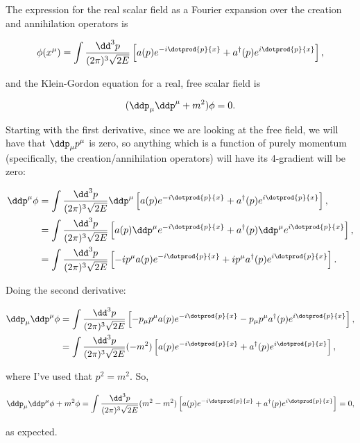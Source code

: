 \section{}

The expression for the real scalar field as a Fourier expansion over the creation and annihilation operators is

\begin{equation}
    \phi(x^{\mu}) = \int \frac{\dd^3p}{(2\pi)^3\sqrt{2E}} \left[a(p)e^{-i \dotprod{p}{x}} + a^{\dagger}(p)e^{i\dotprod{p}{x}}\right],
\end{equation}

and the Klein-Gordon equation for a real, free scalar field is

\begin{equation}
    (\ddp_{\mu}\ddp^{\mu} + m^2)\phi = 0.
\end{equation}

Starting with the first derivative, since we are looking at the free field, we will have that $\ddp_{\mu}p^{\mu}$ is zero, so anything which is a function of purely momentum (specifically, the creation/annihilation operators) will have its 4-gradient will be zero:

\begin{align*}
    \ddp^{\mu}\phi &= \int \frac{\dd^3p}{(2\pi)^3\sqrt{2E}} \ddp^{\mu} \left[a(p)e^{-i \dotprod{p}{x}} + a^{\dagger}(p)e^{i\dotprod{p}{x}}\right], \\
    &= \int \frac{\dd^3p}{(2\pi)^3\sqrt{2E}} \left[a(p) \ddp^{\mu}e^{-i \dotprod{p}{x}} + a^{\dagger}(p) \ddp^{\mu}e^{i\dotprod{p}{x}}\right], \\
    &= \int \frac{\dd^3p}{(2\pi)^3\sqrt{2E}} \left[-ip^{\mu} a(p)e^{-i \dotprod{p}{x}} + ip^{\mu} a^{\dagger}(p)e^{i\dotprod{p}{x}}\right].
\end{align*}

Doing the second derivative:

\begin{align*}
    \ddp_{\mu}\ddp^{\mu}\phi &= \int \frac{\dd^3p}{(2\pi)^3\sqrt{2E}} \left[-p_{\mu}p^{\mu} a(p)e^{-i \dotprod{p}{x}} -p_{\mu}p^{\mu} a^{\dagger}(p)e^{i\dotprod{p}{x}}\right], \\
    &= \int \frac{\dd^3p}{(2\pi)^3\sqrt{2E}} (-m^2) \left[a(p)e^{-i \dotprod{p}{x}} + a^{\dagger}(p)e^{i\dotprod{p}{x}}\right],
\end{align*}

where I've used that $p^2 = m^2$. So,

\begin{equation*}
    \ddp_{\mu}\ddp^{\mu}\phi + m^2\phi = \int \frac{\dd^3p}{(2\pi)^3\sqrt{2E}} (m^2 -m^2) \left[a(p)e^{-i \dotprod{p}{x}} + a^{\dagger}(p)e^{i\dotprod{p}{x}}\right] = 0,
\end{equation*}

as expected.